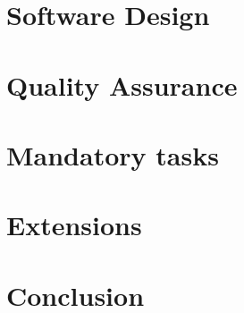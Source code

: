 

	
	\frontmatter
		
	\newpage	
	\tableofcontents 

	
	\mainmatter
	
	\chapter{Software Design}
	
	
	\chapter{Quality Assurance}
	
	 
	
	\chapter{Mandatory tasks}
	
	
	
	
	
	\chapter{Extensions}
	
	
	
	
	
	\chapter{Conclusion}
	
	
	
	\backmatter
	

